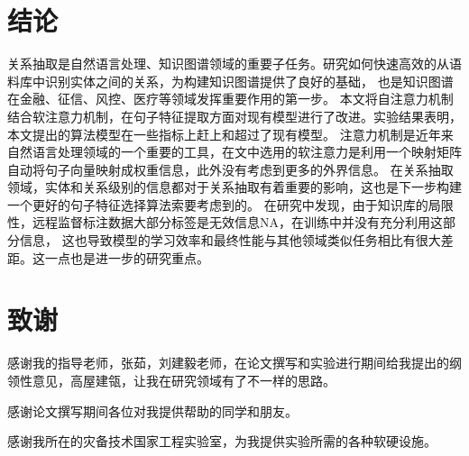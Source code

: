 \documentclass[UTF8]{csoarticle}
\begin{document}
\section{结论}
关系抽取是自然语言处理、知识图谱领域的重要子任务。研究如何快速高效的从语料库中识别实体之间的关系，为构建知识图谱提供了良好的基础，
也是知识图谱在金融、征信、风控、医疗等领域发挥重要作用的第一步。
本文将自注意力机制结合软注意力机制，在句子特征提取方面对现有模型进行了改进。实验结果表明，本文提出的算法模型在一些指标上赶上和超过了现有模型。
注意力机制是近年来自然语言处理领域的一个重要的工具，在文中选用的软注意力是利用一个映射矩阵自动将句子向量映射成权重信息，此外没有考虑到更多的外界信息。
在关系抽取领域，实体和关系级别的信息都对于关系抽取有着重要的影响，这也是下一步构建一个更好的句子特征选择算法索要考虑到的。
在研究中发现，由于知识库的局限性，远程监督标注数据大部分标签是无效信息NA，在训练中并没有充分利用这部分信息，
这也导致模型的学习效率和最终性能与其他领域类似任务相比有很大差距。这一点也是进一步的研究重点。
\section*{致谢}
感谢我的指导老师，张茹，刘建毅老师，在论文撰写和实验进行期间给我提出的纲领性意见，高屋建瓴，让我在研究领域有了不一样的思路。

感谢论文撰写期间各位对我提供帮助的同学和朋友。

感谢我所在的灾备技术国家工程实验室，为我提供实验所需的各种软硬设施。
\end{document}
